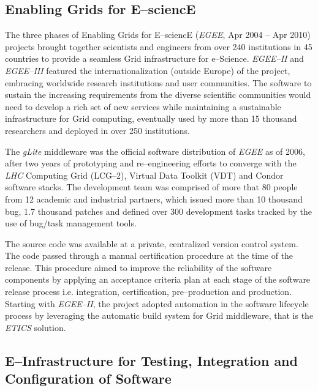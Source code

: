 \documentclass[journal]{IEEEtran}
\begin{document}
\subsection{Enabling Grids for E--sciencE}

The three phases of Enabling Grids for E--sciencE ({\sl EGEE}, Apr 2004 -- Apr 2010)
\cite{cordis:egee, cordis:egee2, cordis:egee3} projects brought together
scientists and engineers from over 240 institutions in 45 countries to
provide a seamless Grid infrastructure for e--Science. {\sl EGEE--II} and {\sl EGEE--III}
featured the internationalization (outside Europe) of the project, embracing worldwide research
institutions and user communities. The software to sustain the increasing
requirements from the diverse scientific communities would need to develop a
rich set of new services while maintaining a sustainable infrastructure for
Grid computing, eventually used by more than 15 thousand researchers and deployed in
over 250 institutions.

The {\sl gLite} middleware \cite{glite} was the
official software distribution of {\sl EGEE} as of 2006, after two years of prototyping and
re--engineering efforts to converge with the {\sl LHC} Computing Grid (LCG--2), Virtual
Data Toolkit (VDT) and Condor \cite{condor} software stacks. The
development team was comprised of more that 80 people from 12 academic and
industrial partners, which issued more than 10 thousand bug, 1.7 thousand patches and
defined over 300 development tasks tracked by the use of bug/task management tools.

The source code was available at a private, centralized version control system.
The code passed through a manual certification procedure at the time of the release.
This procedure aimed to improve the reliability of the software components by applying an
acceptance criteria plan at each stage of the software release process
\cite{egee:acceptance-criteria} i.e. integration, certification, pre--production and
production. Starting with {\sl EGEE--II}, the project adopted automation in the software
lifecycle process by leveraging the automatic build system for Grid middleware, that is
the {\sl ETICS} \cite{etics} solution.

\subsection{E--Infrastructure for Testing, Integration and Configuration of Software}
\end{document}
